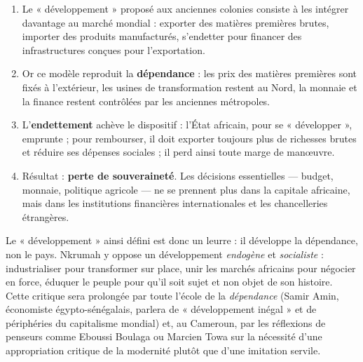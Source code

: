 \documentclass[11pt]{article}
\begin{document}
\begin{enumerate}
\item Le « développement » proposé aux anciennes colonies consiste à les intégrer davantage au marché mondial : exporter des matières premières brutes, importer des produits manufacturés, s'endetter pour financer des infrastructures conçues pour l'exportation.
\item Or ce modèle reproduit la \textbf{dépendance} : les prix des matières premières sont fixés à l'extérieur, les usines de transformation restent au Nord, la monnaie et la finance restent contrôlées par les anciennes métropoles.
\item L'\textbf{endettement} achève le dispositif : l'État africain, pour se « développer », emprunte ; pour rembourser, il doit exporter toujours plus de richesses brutes et réduire ses dépenses sociales ; il perd ainsi toute marge de manœuvre.
\item Résultat : \textbf{perte de souveraineté}. Les décisions essentielles — budget, monnaie, politique agricole — ne se prennent plus dans la capitale africaine, mais dans les institutions financières internationales et les chancelleries étrangères.
\end{enumerate}

Le « développement » ainsi défini est donc un leurre : il développe la dépendance, non le pays. Nkrumah y oppose un développement \emph{endogène} et \emph{socialiste} : industrialiser pour transformer sur place, unir les marchés africains pour négocier en force, éduquer le peuple pour qu'il soit sujet et non objet de son histoire. Cette critique sera prolongée par toute l'école de la \emph{dépendance} (Samir Amin, économiste égypto-sénégalais, parlera de « développement inégal » et de périphéries du capitalisme mondial) et, au Cameroun, par les réflexions de penseurs comme Eboussi Boulaga ou Marcien Towa sur la nécessité d'une appropriation critique de la modernité plutôt que d'une imitation servile.
\end{document}
